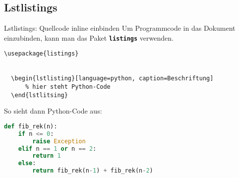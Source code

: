 \subsection{Lstlistings}
\begin{frame}[fragile]{Lstlistings: Quellcode inline einbinden}
Um Programmcode in das Dokument einzubinden, kann man das Paket \textbf{\texttt{listings}} verwenden.
\vspace{2ex}

\begin{lstlisting}[style=tex]
\usepackage{listings}


  \begin{lstlisting}[language=python, caption=Beschriftung]
      % hier steht Python-Code
  \end{lstlitsing}
\end{lstlisting}


So sieht dann Python-Code aus:
\begin{lstlisting}[language=python, caption = Berechnung der n-ten Fibonacci in Python durch Rekursion]
def fib_rek(n):
    if n <= 0:
        raise Exception
    elif n == 1 or n == 2:
        return 1
    else:
        return fib_rek(n-1) + fib_rek(n-2)
\end{lstlisting}

\end{frame}

